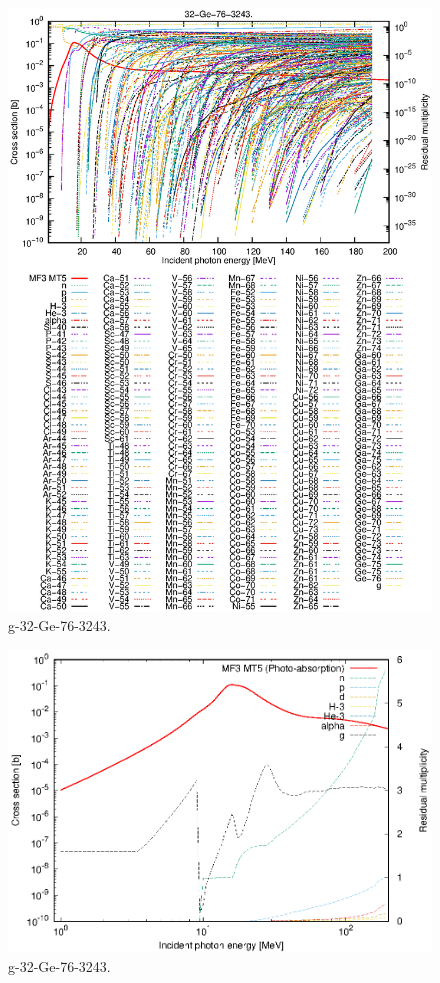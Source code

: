 \begin{figure}
 \includegraphics[width=\linewidth]{eps/g_32-Ge-76_3243.eps}
  \caption{g-32-Ge-76-3243.}
\end{figure}
\newpage \clearpage

\begin{figure}
 \includegraphics[width=\linewidth]{eps-log/g_32-Ge-76_3243.eps}
 \caption{g-32-Ge-76-3243.}
\end{figure}
\newpage \clearpage

